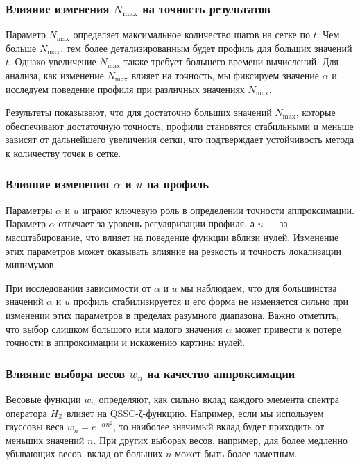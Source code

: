 \documentclass{article}
\numberwithin{equation}{section}
\theoremstyle{plain}
\theoremstyle{definition}
\theoremstyle{remark}
\def\alpha{α}\def\beta{β}\def\gamma{γ}\def\Gamma{Γ}%
\begin{document}
\subsubsection{Влияние изменения \( N_{\max} \) на точность результатов}
\label{subsubsec:Nmax-dependence}

\noindent
Параметр \( N_{\max} \) определяет максимальное количество шагов на сетке по \( t \). Чем больше \( N_{\max} \), тем более детализированным будет профиль для больших значений \( t \). Однако увеличение \( N_{\max} \) также требует большего времени вычислений. Для анализа, как изменение \( N_{\max} \) влияет на точность, мы фиксируем значение \( \alpha \) и исследуем поведение профиля при различных значениях \( N_{\max} \).

Результаты показывают, что для достаточно больших значений \( N_{\max} \), которые обеспечивают достаточную точность, профили становятся стабильными и меньше зависят от дальнейшего увеличения сетки, что подтверждает устойчивость метода к количеству точек в сетке.

\subsubsection{Влияние изменения \( \alpha \) и \( u \) на профиль}
\label{subsubsec:alpha-u-dependence}

\noindent
Параметры \( \alpha \) и \( u \) играют ключевую роль в определении точности аппроксимации. Параметр \( \alpha \) отвечает за уровень регуляризации профиля, а \( u \) — за масштабирование, что влияет на поведение функции вблизи нулей. Изменение этих параметров может оказывать влияние на резкость и точность локализации минимумов.

При исследовании зависимости от \( \alpha \) и \( u \) мы наблюдаем, что для большинства значений \( \alpha \) и \( u \) профиль стабилизируется и его форма не изменяется сильно при изменении этих параметров в пределах разумного диапазона. Важно отметить, что выбор слишком большого или малого значения \( \alpha \) может привести к потере точности в аппроксимации и искажению картины нулей.

\subsubsection{Влияние выбора весов \( w_n \) на качество аппроксимации}
\label{subsubsec:weights-dependence}
\label{subsec:weights-dependence}

\noindent
Весовые функции \( w_n \) определяют, как сильно вклад каждого элемента спектра оператора \( H_{\mathbb{Z}} \) влияет на QSSC-ζ-функцию. Например, если мы используем гауссовы веса \( w_n = e^{-\alpha n^2} \), то наиболее значимый вклад будет приходить от меньших значений \( n \). При других выборах весов, например, для более медленно убывающих весов, вклад от больших \( n \) может быть более заметным.
\end{document}

